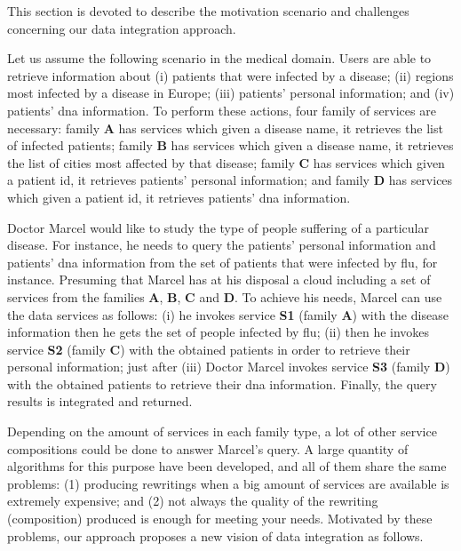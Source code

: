 This section is devoted to describe the motivation scenario and challenges
concerning our data integration approach.
%

Let us assume the following scenario in the medical domain. 
Users are able to retrieve information about (i) patients that were infected by a disease; 
(ii) regions most infected by a disease in Europe; 
(iii) patients' personal information; and 
(iv) patients' dna information.
To perform these actions, four family of services are necessary: family
\textbf{A} has services which given a disease name, it retrieves the list
of infected patients; family \textbf{B} has services which given a disease name,
it retrieves the list of cities most affected by that disease; family \textbf{C}
has services which given a patient id, it retrieves patients' personal
information; and family \textbf{D} has services which given a patient id, it
retrieves patients' dna information. 

Doctor Marcel would like to study the type of people suffering of a
particular disease. For instance, he needs to query the patients' personal
information and patients' dna information from the set of patients that were
infected by flu, for instance. Presuming that Marcel has at his disposal a cloud
including a set of services from the families \textbf{A}, \textbf{B}, \textbf{C} and \textbf{D}. To achieve
his needs, Marcel can use the data services as follows: (i) he invokes service
\textbf{S1} (family \textbf{A}) with the disease information then he gets the
set of people infected by flu; (ii) then he invokes service \textbf{S2} (family
\textbf{C}) with the obtained patients in order to retrieve their personal
information; just after (iii) Doctor Marcel invokes service \textbf{S3} (family
\textbf{D}) with the obtained patients to retrieve their dna information.
Finally, the query results is integrated and returned.

Depending on the amount of services in each family type, a lot of other service 
compositions could be done to answer Marcel's query. A large quantity of
algorithms for this purpose have been developed, and all of them share the same
problems: (1) producing rewritings when a big amount of services are available
is extremely expensive; and (2) not always the quality of the rewriting (composition) produced is enough for meeting your needs.
Motivated by these problems, our approach proposes a new vision of data
integration as follows.

